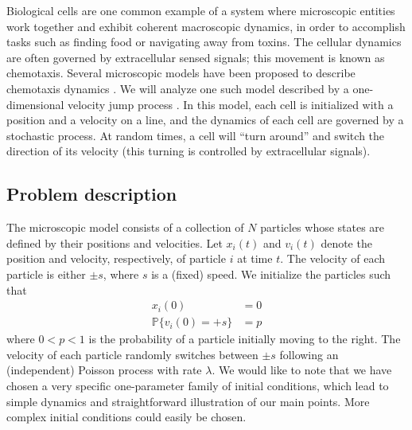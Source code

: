 \documentclass[preprint]{elsarticle}
\begin{document}

Biological cells are one common example of a system where microscopic entities work together and exhibit coherent macroscopic dynamics, in order to accomplish tasks such as finding food or navigating away from toxins.
%
The cellular dynamics are often governed by extracellular sensed signals; this movement is known as chemotaxis. 
%
Several microscopic models have been proposed to describe chemotaxis dynamics \cite{othmer1988models, codling2008random}.
%
We will analyze one such model described by a one-dimensional velocity jump process \cite{othmer2000diffusion}.
%
In this model, each cell is initialized with a position and a velocity on a line, and the dynamics of each cell are governed by a stochastic process.
%
At random times, a cell will ``turn around'' and switch the direction of its velocity (this turning is controlled by extracellular signals). 
%

\subsection{Problem description}

The microscopic model consists of a collection of $N$ particles whose states are defined by their positions and velocities. 
%
Let $x_i(t)$ and $v_i(t)$ denote the position and velocity, respectively, of particle $i$ at time $t$.
%
The velocity of each particle is either $\pm s$, where $s$ is a (fixed) speed. 
%
We initialize the particles such that
\begin{equation}\label{eqn:system}
\begin{aligned}
x_i(0) & = 0 \\
\mathbb{P} \{ v_i(0) = +s \} & = p
\end{aligned}
\end{equation}
where $0 < p < 1$ is the probability of a particle initially moving to the right.
%
The velocity of each particle randomly switches between $\pm s$ following an (independent) Poisson process with rate $\lambda$.
%
We would like to note that we have chosen a very specific one-parameter family of initial conditions, which lead to simple dynamics and straightforward illustration of our main points.
%
More complex initial conditions could easily be chosen. 
\end{document}
